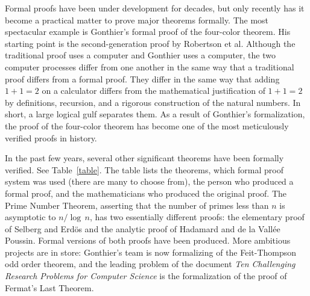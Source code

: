 \documentclass{llncs}
\begin{document}
Formal proofs have been under development for decades, but only recently
has it become a practical matter to prove major theorems formally.
The most spectacular
example is Gonthier's formal proof of the four-color theorem.  His
starting point is the second-generation 
proof by Robertson et al.  Although the traditional proof uses a computer
and Gonthier uses a computer,  the two computer processes
differ from one another in the same way that a traditional proof differs
from a formal proof.  They differ in the same way that adding $1+1=2$ on
a calculator differs from the mathematical
justification of $1+1=2$ by definitions,
recursion, and a rigorous construction of the natural numbers.  
In short, a large logical gulf separates them.
As a result of Gonthier's formalization,
the proof of the four-color theorem has become one of the most meticulously verified proofs
in history.

In the past few years, several other significant theorems have been
formally verified. See Table~\ref{table}.  The table lists the
theorems, which formal proof system was used (there are many to choose from), the person who
produced a formal proof, and the mathematicians who produced the
original proof.  The Prime Number Theorem, asserting that the
number of primes less than $n$ is asymptotic to $n/\log\,n$, has
two essentially different proofs: the elementary proof of
Selberg and Erd\"os and the analytic proof of Hadamard and
de la Vall\'ee Poussin.  Formal versions of both proofs have
been produced.   More ambitious projects are in store:
Gonthier's team is now formalizing of the Feit-Thompson odd order theorem, and
 the leading problem of the document {\it Ten Challenging
Research Problems for Computer Science} is the formalization
of the proof of Fermat's Last Theorem.






\smallskip
\end{document}
